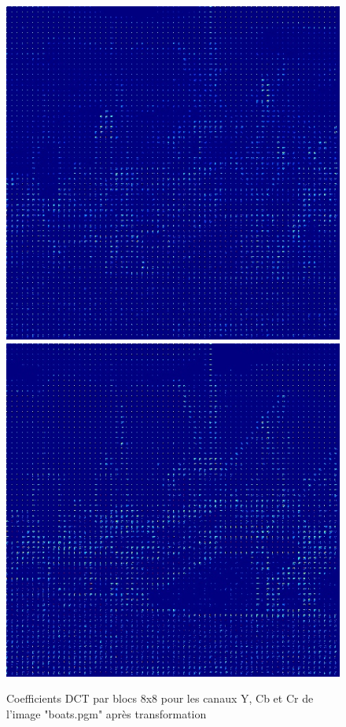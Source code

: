 \documentclass[12pt]{report}
\begin{document}
\begin{figure}[H]
\begin{center}
\includegraphics[scale=0.25]{../ImageRes/blockdct_transform_1.jpg} 
\includegraphics[scale=0.25]{../ImageRes/blockdct_transform_2.jpg} 
\caption{Coefficients DCT par blocs 8x8 pour les canaux Y, Cb et Cr de l'image "boats.pgm" après transformation}
\end{center}
\end{figure}
\end{document}
